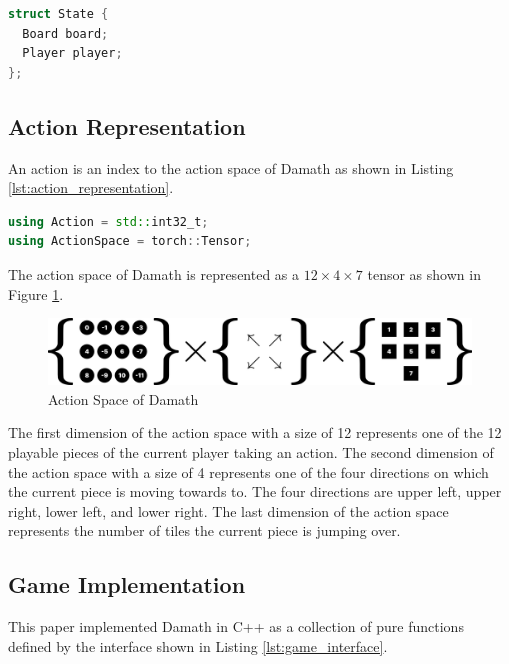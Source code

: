 \begin{lstlisting}[language=C++,captionpos=b,label={lst:state_representation},caption={State Representation of Damath}]
struct State {
  Board board;
  Player player;
};
\end{lstlisting}

\subsection{Action Representation}

An action is an index to the action space of Damath as shown in Listing \ref{lst:action_representation}.

\begin{lstlisting}[language=C++,captionpos=b,label={lst:action_representation},caption={Action Representation of Damath}]
using Action = std::int32_t;
using ActionSpace = torch::Tensor;
\end{lstlisting}

The action space of Damath is represented as a $12 \times 4 \times 7$ tensor as shown in Figure \ref{fig:action_space}.

\begin{figure}[htb]
    \centering
    \includegraphics[width=0.7\linewidth]{images/action_space.png}
    \caption{Action Space of Damath}
    \label{fig:action_space}
\end{figure}

The first dimension of the action space with a size of 12 represents one of the 12 playable pieces of the current player taking an action. The second dimension of the action space with a size of 4 represents one of the four directions on which the current piece is moving towards to. The four directions are upper left, upper right, lower left, and lower right. The last dimension of the action space represents the number of tiles the current piece is jumping over.

\subsection{Game Implementation}

This paper implemented Damath in C++ as a collection of pure functions defined by the interface shown in Listing \ref{lst:game_interface}.

